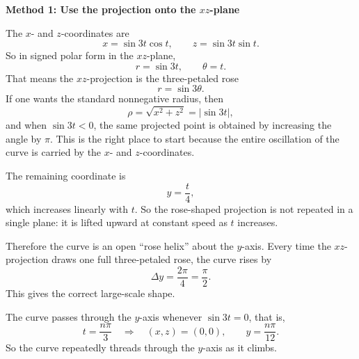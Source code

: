 \documentclass[a4paper,12pt,twocolumn]{article}
\newenvironment{solutionbox}{\begin{framed}}{\end{framed}}
\begin{document}
\begin{solutionbox}
\textbf{Method 1: Use the projection onto the \(xz\)-plane}

\begin{steps}
\item The \(x\)- and \(z\)-coordinates are
\[
x=\sin 3t\cos t,\qquad z=\sin 3t\sin t.
\]
So in signed polar form in the \(xz\)-plane,
\[
r=\sin 3t,\qquad \theta=t.
\]
That means the \(xz\)-projection is the three-petaled rose
\[
r=\sin 3\theta.
\]
If one wants the standard nonnegative radius, then
\[
\rho=\sqrt{x^2+z^2}=|\sin 3t|,
\]
and when \(\sin 3t<0\), the same projected point is obtained by increasing the angle by \(\pi\). This is the right place to start because the entire oscillation of the curve is carried by the \(x\)- and \(z\)-coordinates.

\item The remaining coordinate is
\[
y=\frac{t}{4},
\]
which increases linearly with \(t\). So the rose-shaped projection is not repeated in a single plane: it is lifted upward at constant speed as \(t\) increases.

\item Therefore the curve is an open ``rose helix'' about the \(y\)-axis. Every time the \(xz\)-projection draws one full three-petaled rose, the curve rises by
\[
\Delta y=\frac{2\pi}{4}=\frac{\pi}{2}.
\]
This gives the correct large-scale shape.

\item The curve passes through the \(y\)-axis whenever \(\sin 3t=0\), that is,
\[
t=\frac{n\pi}{3}
\quad\Longrightarrow\quad
(x,z)=(0,0),\qquad y=\frac{n\pi}{12}.
\]
So the curve repeatedly threads through the \(y\)-axis as it climbs.
\end{steps}
\end{solutionbox}
\end{document}
